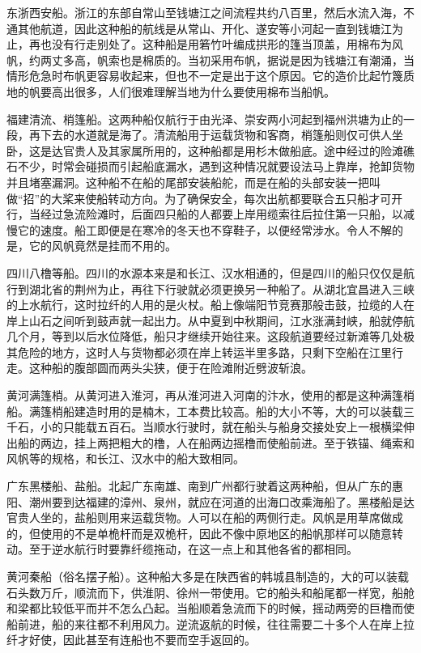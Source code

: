 \documentclass[12pt,UTF8]{ctexbook}
\begin{document}
东浙西安船。浙江的东部自常山至钱塘江之间流程共约八百里，然后水流入海，不通其他航道，因此这种船的航线是从常山、开化、遂安等小河起一直到钱塘江为止，再也没有行走别处了。这种船是用箬竹叶编成拱形的篷当顶盖，用棉布为风帆，约两丈多高，帆索也是棉质的。当初采用布帆，据说是因为钱塘江有潮涌，当情形危急时布帆更容易收起来，但也不一定是出于这个原因。它的造价比起竹篾质地的帆要高出很多，人们很难理解当地为什么要使用棉布当船帆。

福建清流、梢篷船。这两种船仅航行于由光泽、崇安两小河起到福州洪塘为止的一段，再下去的水道就是海了。清流船用于运载货物和客商，梢篷船则仅可供人坐卧，这是达官贵人及其家属所用的，这种船都是用杉木做船底。途中经过的险滩礁石不少，时常会碰损而引起船底漏水，遇到这种情况就要设法马上靠岸，抢卸货物并且堵塞漏洞。这种船不在船的尾部安装船舵，而是在船的头部安装一把叫做“招”的大桨来使船转动方向。为了确保安全，每次出航都要联合五只船才可开行，当经过急流险滩时，后面四只船的人都要上岸用缆索往后拉住第一只船，以减慢它的速度。船工即便是在寒冷的冬天也不穿鞋子，以便经常涉水。令人不解的是，它的风帆竟然是挂而不用的。

四川八橹等船。四川的水源本来是和长江、汉水相通的，但是四川的船只仅仅是航行到湖北省的荆州为止，再往下行驶就必须更换另一种船了。从湖北宜昌进入三峡的上水航行，这时拉纤的人用的是火杖。船上像端阳节竞赛那般击鼓，拉缆的人在岸上山石之间听到鼓声就一起出力。从中夏到中秋期间，江水涨满封峡，船就停航几个月，等到以后水位降低，船只才继续开始往来。这段航道要经过新滩等几处极其危险的地方，这时人与货物都必须在岸上转运半里多路，只剩下空船在江里行走。这种船的腹部圆而两头尖狭，便于在险滩附近劈波斩浪。

黄河满篷梢。从黄河进入淮河，再从淮河进入河南的汴水，使用的都是这种满篷梢船。满篷梢船建造时用的是楠木，工本费比较高。船的大小不等，大的可以装载三千石，小的只能载五百石。当顺水行驶时，就在船头与船身交接处安上一根横梁伸出船的两边，挂上两把粗大的橹，人在船两边摇橹而使船前进。至于铁锚、绳索和风帆等的规格，和长江、汉水中的船大致相同。

广东黑楼船、盐船。北起广东南雄、南到广州都行驶着这两种船，但从广东的惠阳、潮州要到达福建的漳州、泉州，就应在河道的出海口改乘海船了。黑楼船是达官贵人坐的，盐船则用来运载货物。人可以在船的两侧行走。风帆是用草席做成的，但使用的不是单桅杆而是双桅杆，因此不像中原地区的船帆那样可以随意转动。至于逆水航行时要靠纤缆拖动，在这一点上和其他各省的都相同。

黄河秦船（俗名摆子船）。这种船大多是在陕西省的韩城县制造的，大的可以装载石头数万斤，顺流而下，供淮阴、徐州一带使用。它的船头和船尾都一样宽，船舱和梁都比较低平而并不怎么凸起。当船顺着急流而下的时候，摇动两旁的巨橹而使船前进，船的来往都不利用风力。逆流返航的时候，往往需要二十多个人在岸上拉纤才好使，因此甚至有连船也不要而空手返回的。
\end{document}
